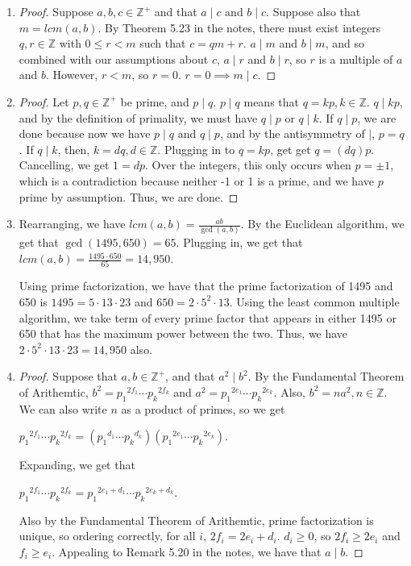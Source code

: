 \documentclass[12pt]{article}
\begin{document}
\begin{enumerate}[start = 1, label = {\bfseries Question \arabic*:}, leftmargin=1in]
\item \begin{proof}
    Suppose $a,b,c\in \mathbb{Z}^{+}$ and that $a\mid c$ and $b\mid c$. Suppose also that $m=lcm(a,b)$. By Theorem 5.23 in the notes, there must exist integers $q,r\in \mathbb{Z}$ with $0\leq r < m$ such that $c=qm+r$. $a\mid m$ and $b\mid m$, and so combined with our assumptions about $c$, $a\mid r$ and $b\mid r$, so $r$ is a multiple
    of $a$ and $b$. However, $r<m$, so $r =0$. $r=0 \implies m\mid c$.
\end{proof}

\item \begin{proof}
    Let $p,q \in \mathbb{Z}^{+}$ be prime, and $p\mid q$. $p\mid q$ means that $q=kp, k\in \mathbb{Z}$. $q\mid kp$, and by the definition of primality, we must have $q\mid p$ or $q\mid k$. If $q\mid p$, we are done because now we have
    $p\mid q$ and $q\mid p$, and by the antisymmetry of $\mid$, $p=q$. If $q\mid k$, then, $k=dq, d\in \mathbb{Z}$. Plugging in to $q=kp$, get get $q=(dq)p$. Cancelling, we get $1=dp$. Over the integers, this 
    only occurs when $p=\pm 1$, which is a contradiction because neither -1 or 1 is a prime, and we have $p$ prime by assumption. Thus, we are done.
\end{proof}

\item Rearranging, we have $lcm(a,b) = \frac{ab}{\gcd(a,b)}$. By the Euclidean algorithm, we get that $\gcd(1495, 650) = 65$. Plugging in, we get that $lcm(a,b)=\frac{1495 \cdot 650}{65}=14,950$.\par Using prime factorization, 
    we have that the prime factorization of 1495 and 650 is $1495 = 5\cdot 13\cdot 23$ and $650 = 2\cdot 5^2\cdot 13$. Using the least common multiple algorithm, we take term of every prime factor that appears in either 1495 or 650 that has the maximum power between the two. Thus, we have $2\cdot 5^2\cdot 13\cdot 23 = 14,950$ also.

\item\begin{proof}
    Suppose that $a,b \in \mathbb{Z}^{+}$, and that $a^2\mid b^2$. By the Fundamental Theorem of Arithemtic, $b^2={p_1}^{2f_1}\cdots {p_k}^{2f_k}$ and $a^2={p_1}^{2e_1}\cdots {p_k}^{2e_k}$. Also, $b^2=na^2, n\in \mathbb{Z}$. We can also write $n$ as a product of primes, so we get\begin{center}
        ${p_1}^{2f_1}\cdots {p_k}^{2f_k}=({p_1}^{d_1}\cdots {p_k}^{d_k})({p_1}^{2e_1}\cdots {p_k}^{2e_k})$.
    \end{center} Expanding, we get that\begin{center}
        ${p_1}^{2f_1}\cdots {p_k}^{2f_k}={p_1}^{2e_1+d_1}\cdots {p_k}^{2e_k+d_k}$.
    \end{center} Also by the Fundamental Theorem of Arithemtic, prime factorization is unique, so ordering correctly, for all $i$, $2f_i = 2e_i + d_i$. $d_i \geq 0$, so $2f_i \geq 2e_i$ and $f_i \geq e_i$. 
    Appealing to Remark 5.20 in the notes, we have that $a\mid b$.
\end{proof}



\end{enumerate}
\end{document}
